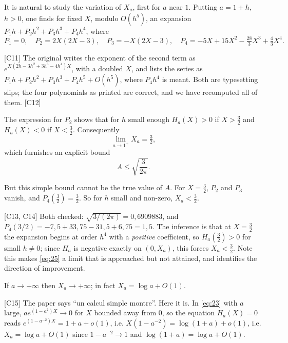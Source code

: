 \documentclass[11pt,reqno]{amsart}
\theoremstyle{plain}
\theoremstyle{definition}
\theoremstyle{remark}
\newcommand{\Ledger}[1]{{\scriptsize\textsf{[#1]}}}
\begin{document}
It is natural to study the variation of $X_a$, first for $a$ near $1$. Putting
$a=1+h$, $h>0$, one finds for fixed $X$, modulo $O(h^5)$, an expansion
$P_1h+P_2h^2+P_3h^3+P_4h^4$, where
\[P_1=0,\quad P_2=2X(2X-3),\quad P_3=-X(2X-3),\quad
  P_4=-5X+15X^2-\tfrac{28}{3}X^3+\tfrac43X^4 .\]

\begin{ournotation}
\Ledger{C11} The original writes the exponent of the second term as
$e^{X(2h-3h^2+3h^3-4h^4)X}$, with a doubled $X$, and lists the series as
$P_1h+P_2h^2+P_3h^3+P_4h^5+O(h^5)$, where $P_4h^4$ is meant. Both are typesetting
slips; the four polynomials as printed are correct, and we have recomputed all of
them. \Ledger{C12}
\end{ournotation}

The expression for $P_2$ shows that for $h$ small enough $H_a(X)>0$ if $X>\tfrac32$
and $H_a(X)<0$ if $X<\tfrac32$. Consequently
\begin{equation}\label{eq:24}
 \lim_{a\to1^+}X_a=\tfrac32,
\end{equation}
which furnishes an explicit bound
\begin{equation}\label{eq:25}
 A\le\sqrt{\frac{3}{2\pi}} .
\end{equation}

But this simple bound cannot be the true value of $A$. For $X=\tfrac32$, $P_2$ and
$P_3$ vanish, and $P_4(\tfrac32)=\tfrac32$. So for $h$ small and non-zero,
$X_a<\tfrac32$.

\begin{expansion}
\Ledger{C13, C14} Both checked: $\sqrt{3/(2\pi)}=0{,}6909883$, and
$P_4(3/2)=-7{,}5+33{,}75-31{,}5+6{,}75=1{,}5$. The inference is that at
$X=\tfrac32$ the expansion begins at order $h^4$ with a \emph{positive} coefficient,
so $H_a(\tfrac32)>0$ for small $h\ne0$; since $H_a$ is negative exactly on
$(0,X_a)$, this forces $X_a<\tfrac32$. Note this makes \eqref{eq:25} a limit that is
approached but not attained, and identifies the direction of improvement.
\end{expansion}

If $a\to+\infty$ then $X_a\to+\infty$; in fact $X_a=\log a+O(1)$.

\begin{filled}
\Ledger{C15} The paper says ``un calcul simple montre''. Here it is. In
\eqref{eq:23} with $a$ large, $ae^{(1-a^2)X}\to0$ for $X$ bounded away from $0$, so
the equation $H_a(X)=0$ reads $e^{(1-a^{-2})X}=1+a+o(1)$, i.e.
$X(1-a^{-2})=\log(1+a)+o(1)$, i.e. $X_a=\log a+O(1)$ since $1-a^{-2}\to1$ and
$\log(1+a)=\log a+O(1)$.
\end{filled}
\end{document}
